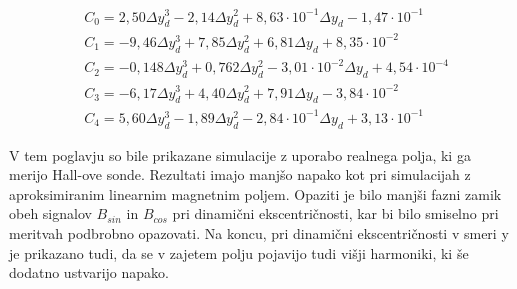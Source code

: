 \begin{eqnarray}
&C_0 =2,50\Delta y_d^{3}-2,14\Delta y_d^{2}+8,63\cdot 10^{-1}\Delta y_d-1,47\cdot 10^{-1}\\                           
&C_1 =-9,46\Delta y_d^{3}+7,85\Delta y_d^{2}+6,81\Delta y_d+8,35\cdot 10^{-2} \\                                       
&C_2 =-0,148\Delta y_d^{3}+0,762\Delta y_d^{2}-3,01\cdot 10^{-2}\Delta y_d+4,54\cdot 10^{-4} \\
&C_3 =-6,17\Delta y_d^{3}+4,40\Delta y_d^{2}+7,91\Delta y_d-3,84\cdot 10^{-2} \\                                       
&C_4 =5,60\Delta y_d^{3}-1,89\Delta y_d^{2}-2,84\cdot 10^{-1}\Delta y_d+3,13\cdot 10^{-1}       
\end{eqnarray}

V tem poglavju so bile prikazane simulacije z uporabo realnega polja, ki ga merijo Hall-ove sonde. Rezultati imajo manjšo napako kot pri simulacijah z aproksimiranim linearnim magnetnim poljem. Opaziti je bilo manjši fazni zamik obeh signalov $B_{sin}$ in $B_{cos}$ pri dinamični ekscentričnosti, kar bi bilo smiselno pri meritvah podbrobno opazovati. Na koncu, pri dinamični ekscentričnosti v smeri y je prikazano tudi, da se v zajetem polju pojavijo tudi višji harmoniki, ki še dodatno ustvarijo napako.